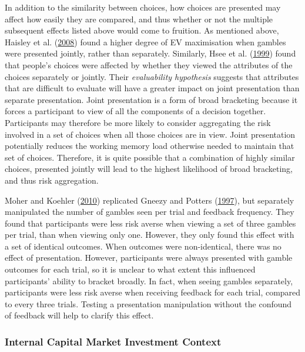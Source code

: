 \documentclass[
  english,
  man, donotrepeattitle,floatsintext]{apa7}
\theoremstyle{definition}
\theoremstyle{definition}
\theoremstyle{definition}
\theoremstyle{definition}
\theoremstyle{remark}
\begin{document}
In addition to the similarity between choices, how choices are presented may
affect how easily they are compared, and thus whether or not the multiple
subsequent effects listed above would come to fruition. As mentioned above,
Haisley et al. (\protect\hyperlink{ref-haisley2008}{2008}) found a higher degree of EV maximisation when gambles were
presented jointly, rather than separately. Similarly, Hsee et al. (\protect\hyperlink{ref-hsee1999}{1999}) found that
people's choices were affected by whether they viewed the attributes of the
choices separately or jointly. Their \emph{evaluability hypothesis} suggests that
attributes that are difficult to evaluate will have a greater impact on joint
presentation than separate presentation. Joint presentation is a form of broad
bracketing because it forces a participant to view of all the components of a
decision together. Participants may therefore be more likely to consider
aggregating the risk involved in a set of choices when all those choices are in
view. Joint presentation potentially reduces the working memory load otherwise
needed to maintain that set of choices. Therefore, it is quite possible that a
combination of highly similar choices, presented jointly will lead to the
highest likelihood of broad bracketing, and thus risk aggregation.

Moher and Koehler (\protect\hyperlink{ref-moher2010}{2010}) replicated Gneezy and Potters (\protect\hyperlink{ref-gneezy1997}{1997}), but separately manipulated the number of
gambles seen per trial and feedback frequency. They found that participants were
less risk averse when viewing a set of three gambles per trial, than when
viewing only one. However, they only found this effect with a set of identical
outcomes. When outcomes were non-identical, there was no effect of presentation.
However, participants were always presented with gamble outcomes for each trial,
so it is unclear to what extent this influenced participants' ability to bracket
broadly. In fact, when seeing gambles separately, participants were less risk
averse when receiving feedback for each trial, compared to every three trials.
Testing a presentation manipulation without the confound of feedback will help
to clarify this effect.

\hypertarget{internal-capital-market-investment-context}{%
\subsubsection{Internal Capital Market Investment Context}\label{internal-capital-market-investment-context}}
\end{document}
